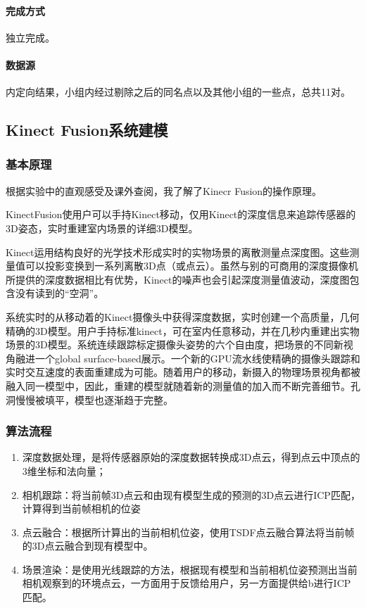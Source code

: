\paragraph{完成方式}独立完成。
\paragraph{数据源}
内定向结果，小组内经过剔除之后的同名点以及其他小组的一些点，总共11对。

\subsection{Kinect Fusion系统建模} 

\subsubsection{基本原理}
根据实验中的直观感受及课外查阅，我了解了Kinecr Fusion的操作原理。

KinectFusion使用户可以手持Kinect移动，仅用Kinect的深度信息来追踪传感器的3D姿态，实时重建室内场景的详细3D模型。

Kinect运用结构良好的光学技术形成实时的实物场景的离散测量点深度图。这些测量值可以投影变换到一系列离散3D点（或点云）。虽然与别的可商用的深度摄像机所提供的深度数据相比有优势，Kinect的噪声也会引起深度测量值波动，深度图包含没有读到的“空洞”。

系统实时的从移动着的Kinect摄像头中获得深度数据，实时创建一个高质量，几何精确的3D模型。用户手持标准kinect，可在室内任意移动，并在几秒内重建出实物场景的3D模型。系统连续跟踪标定摄像头姿势的六个自由度，把场景的不同新视角融进一个global surface-based展示。一个新的GPU流水线使精确的摄像头跟踪和实时交互速度的表面重建成为可能。随着用户的移动，新摄入的物理场景视角都被融入同一模型中，因此，重建的模型就随着新的测量值的加入而不断完善细节。孔洞慢慢被填平，模型也逐渐趋于完整。

\subsubsection{算法流程}
\begin{enumerate}
\item 深度数据处理，是将传感器原始的深度数据转换成3D点云，得到点云中顶点的3维坐标和法向量； 
\item 相机跟踪：将当前帧3D点云和由现有模型生成的预测的3D点云进行ICP匹配，计算得到当前帧相机的位姿 
\item 点云融合：根据所计算出的当前相机位姿，使用TSDF点云融合算法将当前帧的3D点云融合到现有模型中。 
\item 场景渲染：是使用光线跟踪的方法，根据现有模型和当前相机位姿预测出当前相机观察到的环境点云，一方面用于反馈给用户，另一方面提供给b进行ICP匹配。 
\end{enumerate}

